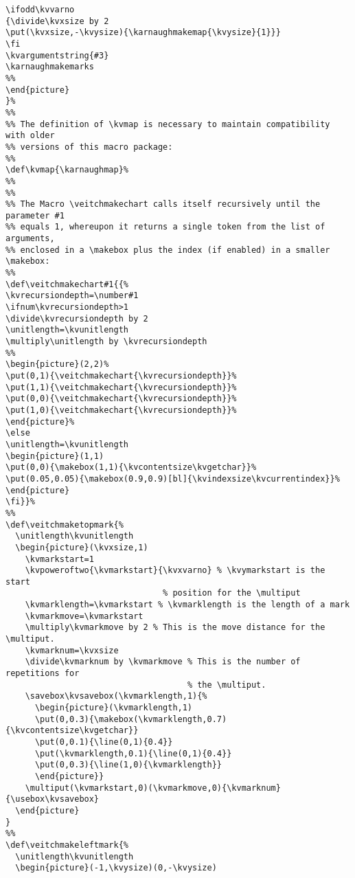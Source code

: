 \documentclass{article}
\begin{document}
\begin{verbatim}
\ifodd\kvvarno
{\divide\kvxsize by 2
\put(\kvxsize,-\kvysize){\karnaughmakemap{\kvysize}{1}}}
\fi
\kvargumentstring{#3}
\karnaughmakemarks
%%
\end{picture}
}%
%%
%% The definition of \kvmap is necessary to maintain compatibility with older
%% versions of this macro package:
%%
\def\kvmap{\karnaughmap}%
%%
%%
%% The Macro \veitchmakechart calls itself recursively until the parameter #1
%% equals 1, whereupon it returns a single token from the list of arguments,
%% enclosed in a \makebox plus the index (if enabled) in a smaller \makebox:
%%
\def\veitchmakechart#1{{%
\kvrecursiondepth=\number#1
\ifnum\kvrecursiondepth>1
\divide\kvrecursiondepth by 2
\unitlength=\kvunitlength
\multiply\unitlength by \kvrecursiondepth
%%
\begin{picture}(2,2)%
\put(0,1){\veitchmakechart{\kvrecursiondepth}}%
\put(1,1){\veitchmakechart{\kvrecursiondepth}}%
\put(0,0){\veitchmakechart{\kvrecursiondepth}}%
\put(1,0){\veitchmakechart{\kvrecursiondepth}}%
\end{picture}%
\else
\unitlength=\kvunitlength
\begin{picture}(1,1)
\put(0,0){\makebox(1,1){\kvcontentsize\kvgetchar}}%
\put(0.05,0.05){\makebox(0.9,0.9)[bl]{\kvindexsize\kvcurrentindex}}%
\end{picture}
\fi}}%
%%
\def\veitchmaketopmark{%
  \unitlength\kvunitlength
  \begin{picture}(\kvxsize,1)
    \kvmarkstart=1
    \kvpoweroftwo{\kvmarkstart}{\kvxvarno} % \kvymarkstart is the start 
                                % position for the \multiput
    \kvmarklength=\kvmarkstart % \kvmarklength is the length of a mark
    \kvmarkmove=\kvmarkstart 
    \multiply\kvmarkmove by 2 % This is the move distance for the \multiput.
    \kvmarknum=\kvxsize
    \divide\kvmarknum by \kvmarkmove % This is the number of repetitions for
                                     % the \multiput.  
    \savebox\kvsavebox(\kvmarklength,1){% 
      \begin{picture}(\kvmarklength,1)
      \put(0,0.3){\makebox(\kvmarklength,0.7){\kvcontentsize\kvgetchar}} 
      \put(0,0.1){\line(0,1){0.4}} 
      \put(\kvmarklength,0.1){\line(0,1){0.4}}
      \put(0,0.3){\line(1,0){\kvmarklength}} 
      \end{picture}}
    \multiput(\kvmarkstart,0)(\kvmarkmove,0){\kvmarknum}{\usebox\kvsavebox}
  \end{picture}
}
%%
\def\veitchmakeleftmark{%
  \unitlength\kvunitlength
  \begin{picture}(-1,\kvysize)(0,-\kvysize)

\end{verbatim}
\end{document}
